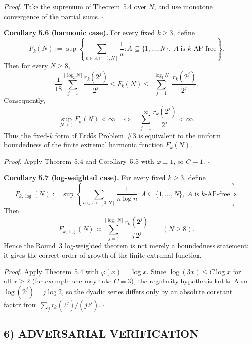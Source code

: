 \noindent\emph{Proof.}
Take the supremum of Theorem~5.4 over $N$, and use monotone convergence of the partial sums.
\hfill$\square$

\medskip
\noindent\textbf{Corollary 5.6 (harmonic case).}
For every fixed $k\ge 3$, define
\[
F_k(N):=\sup\left\{\sum_{n\in A\cap[3,N]}\frac1n:
A\subseteq\{1,\dots,N\},\ A\text{ is }k\text{-AP-free}\right\}.
\]
Then for every $N\ge 8$,
\[
\frac1{18}
\sum_{j=1}^{\lfloor \log_2 N\rfloor}\frac{r_k(2^j)}{2^j}
\le
F_k(N)
\le
\sum_{j=1}^{\lfloor \log_2 N\rfloor}\frac{r_k(2^j)}{2^j}.
\]
Consequently,
\[
\sup_{N\ge 3}F_k(N)<\infty
\quad\Longleftrightarrow\quad
\sum_{j=1}^{\infty}\frac{r_k(2^j)}{2^j}<\infty.
\]
Thus the fixed-$k$ form of Erd\H{o}s Problem~\#3 is equivalent to the uniform boundedness of the finite extremal harmonic function $F_k(N)$.

\noindent\emph{Proof.}
Apply Theorem~5.4 and Corollary~5.5 with $\varphi\equiv 1$, so $C=1$.
\hfill$\square$

\medskip
\noindent\textbf{Corollary 5.7 (log-weighted case).}
For every fixed $k\ge 3$, define
\[
F_{k,\log}(N):=\sup\left\{\sum_{n\in A\cap[3,N]}\frac{1}{n\log n}:
A\subseteq\{1,\dots,N\},\ A\text{ is }k\text{-AP-free}\right\}.
\]
Then
\[
F_{k,\log}(N)
\asymp
\sum_{j=1}^{\lfloor \log_2 N\rfloor}
\frac{r_k(2^j)}{j\,2^j}
\qquad (N\ge 8).
\]
Hence the Round~3 log-weighted theorem is not merely a boundedness statement: it gives the correct order of growth of the finite extremal function.

\noindent\emph{Proof.}
Apply Theorem~5.4 with $\varphi(x)=\log x$. Since $\log(3x)\le C\log x$ for all $x\ge 2$ (for example one may take $C=3$), the regularity hypothesis holds. Also $\log(2^j)=j\log 2$, so the dyadic series differs only by an absolute constant factor from $\sum_j r_k(2^j)/(j2^j)$.
\hfill$\square$

\subsection{6) ADVERSARIAL VERIFICATION}

